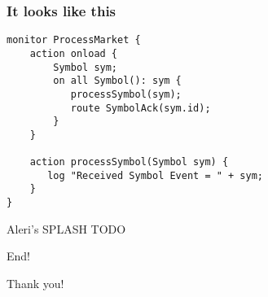 \documentclass[brown, compress, mathserif]{beamer}
\begin{document}
\begin{frame}[fragile]
  \frametitle{It looks like this}

  \begin{verbatim}
monitor ProcessMarket {
    action onload {
        Symbol sym;
        on all Symbol(): sym {
           processSymbol(sym);
           route SymbolAck(sym.id);
        }
    }

    action processSymbol(Symbol sym) {
       log "Received Symbol Event = " + sym;
    }
}
\end{verbatim}

\end{frame}


\begin{frame}{Aleri's SPLASH}
  TODO
\end{frame}


\begin{frame}{End!}
  \begin{center}
    Thank you!
  \end{center}
\end{frame}
\end{document}
